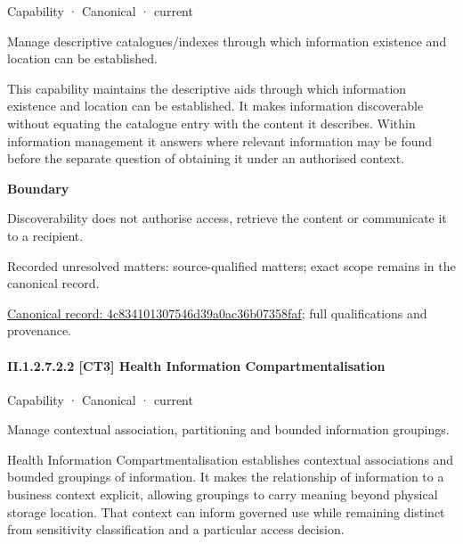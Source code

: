 \label{element:4c834101307546d39a0ac36b07358faf}
{\small Capability · Canonical · current}\par

Manage descriptive catalogues/indexes through which information existence and location can be established.



This capability maintains the descriptive aids through which information existence and location can be established. It makes information discoverable without equating the catalogue entry with the content it describes. Within information management it answers where relevant information may be found before the separate question of obtaining it under an authorised context.



\textbf{Boundary}



Discoverability does not authorise access, retrieve the content or communicate it to a recipient.


{\small Recorded unresolved matters: source-qualified matters; exact scope remains in the canonical record.}\par
{\footnotesize \href{../../../../../../../continuum/strategy/capability/4c834101307546d39a0ac36b07358faf.md}{Canonical record: 4c834101307546d39a0ac36b07358faf}; full qualifications and provenance.}\par
\paragraph*{II.1.2.7.2.2 [CT3] Health Information Compartmentalisation}
\label{navigation:II.1.2.7.2.2}

\label{element:660d78d6a34041939d1c290266d47f03}
{\small Capability · Canonical · current}\par

Manage contextual association, partitioning and bounded information groupings.



Health Information Compartmentalisation establishes contextual associations and bounded groupings of information. It makes the relationship of information to a business context explicit, allowing groupings to carry meaning beyond physical storage location. That context can inform governed use while remaining distinct from sensitivity classification and a particular access decision.



